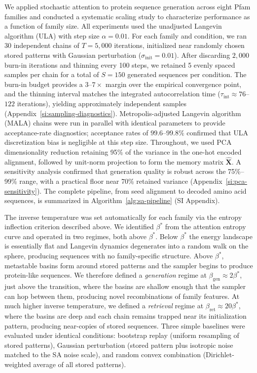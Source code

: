 
We applied stochastic attention to protein sequence generation across eight Pfam families and conducted a systematic scaling study to characterize performance as a function of family size. All experiments used the unadjusted Langevin algorithm (ULA) with step size $\alpha=0.01$. For each family and condition, we ran 30 independent chains of $T=5{,}000$ iterations, initialized near randomly chosen stored patterns with Gaussian perturbation ($\sigma_{\mathrm{init}}=0.01$). After discarding $2{,}000$ burn-in iterations and thinning every 100 steps, we retained 5 evenly spaced samples per chain for a total of $S=150$ generated sequences per condition. The burn-in budget provides a $3$--$7\times$ margin over the empirical convergence point, and the thinning interval matches the integrated autocorrelation time ($\tau_{\mathrm{int}} \approx 76$--$122$ iterations), yielding approximately independent samples (Appendix~\ref{si:sampling-diagnostics}). Metropolis-adjusted Langevin algorithm (MALA) chains were run in parallel with identical parameters to provide acceptance-rate diagnostics; acceptance rates of $99.6$--$99.8\%$ confirmed that ULA discretization bias is negligible at this step size. Throughout, we used PCA dimensionality reduction retaining 95\% of the variance in the one-hot encoded alignment, followed by unit-norm projection to form the memory matrix $\hat{\mathbf{X}}$. A sensitivity analysis confirmed that generation quality is robust across the 75\%--99\% range, with a practical floor near 70\% retained variance (Appendix~\ref{si:pca-sensitivity}). The complete pipeline, from seed alignment to decoded amino acid sequences, is summarized in Algorithm~\ref{alg:sa-pipeline} (SI Appendix).

The inverse temperature was set automatically for each family via the entropy inflection criterion described above. We identified $\beta^*$ from the attention entropy curve and operated in two regimes, both above $\beta^*$. Below $\beta^*$ the energy landscape is essentially flat and Langevin dynamics degenerates into a random walk on the sphere, producing sequences with no family-specific structure. Above $\beta^*$, metastable basins form around stored patterns and the sampler begins to produce protein-like sequences. We therefore defined a \emph{generation} regime at $\beta_{\mathrm{gen}} \approx 2\beta^*$, just above the transition, where the basins are shallow enough that the sampler can hop between them, producing novel recombinations of family features. At much higher inverse temperature, we defined a \emph{retrieval} regime at $\beta_{\mathrm{ret}} \approx 20\beta^*$, where the basins are deep and each chain remains trapped near its initialization pattern, producing near-copies of stored sequences. Three simple baselines were evaluated under identical conditions: bootstrap replay (uniform resampling of stored patterns), Gaussian perturbation (stored pattern plus isotropic noise matched to the SA noise scale), and random convex combination (Dirichlet-weighted average of all stored patterns).

